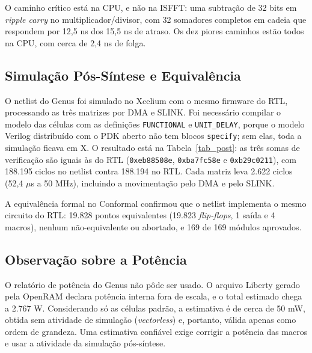 \documentclass[conference]{IEEEtran}
\begin{document}
O caminho crítico está na CPU, e não na ISFFT: uma subtração de 32 bits em \textit{ripple carry} no multiplicador/divisor, com 32 somadores completos em cadeia que respondem por 12,5 ns dos 15,5 ns de atraso. Os dez piores caminhos estão todos na CPU, com cerca de 2,4 ns de folga.

\subsection{Simulação Pós-Síntese e Equivalência}
O netlist do Genus foi simulado no Xcelium com o mesmo firmware do RTL, processando as três matrizes por DMA e SLINK. Foi necessário compilar o modelo das células com as definições \texttt{FUNCTIONAL} e \texttt{UNIT\_DELAY}, porque o modelo Verilog distribuído com o PDK aberto não tem blocos \texttt{specify}; sem elas, toda a simulação ficava em X. O resultado está na Tabela~\ref{tab_post}: as três somas de verificação são iguais às do RTL (\texttt{0xeb88508e}, \texttt{0xba7fc58e} e \texttt{0xb29c0211}), com 188.195 ciclos no netlist contra 188.194 no RTL. Cada matriz leva 2.622 ciclos (52,4 $\mu$s a 50 MHz), incluindo a movimentação pelo DMA e pelo SLINK.

A equivalência formal no Conformal confirmou que o netlist implementa o mesmo circuito do RTL: 19.828 pontos equivalentes (19.823 \textit{flip-flops}, 1 saída e 4 macros), nenhum não-equivalente ou abortado, e 169 de 169 módulos aprovados.

\begin{table}[htbp]
\caption{Verificação da síntese}
\label{tab_post}
\begin{center}
\end{center}
\end{table}

\subsection{Observação sobre a Potência}
O relatório de potência do Genus não pôde ser usado. O arquivo Liberty gerado pela OpenRAM declara potência interna fora de escala, e o total estimado chega a 2.767 W. Considerando só as células padrão, a estimativa é de cerca de 50 mW, obtida sem atividade de simulação (\textit{vectorless}) e, portanto, válida apenas como ordem de grandeza. Uma estimativa confiável exige corrigir a potência das macros e usar a atividade da simulação pós-síntese.
\end{document}

